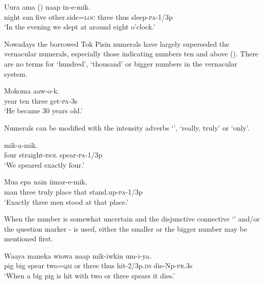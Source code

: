 \ea%
\label{ex:x90}
\gll Uura ama  ()  naap in-e-mik. \\
night sun five other.side=\textsc{loc} three thus sleep-\textsc{pa}-1/3p\\
\glt`In the evening we slept at around eight o'clock.'
\z

Nowadays the borrowed Tok Pisin numerals have largely superseded the vernacular numerals, especially those indicating numbers ten and above (). There are no terms for `hundred', `thousand' or bigger numbers in the vernacular system.

\ea%
\label{ex:x91}
\gll Mokoma   aaw-o-k. \\
year ten three get-\textsc{pa}-3s\\
\glt`He became 30 years old.'
\z

Numerals can be modified with the intensity adverbs  `',  `really, truly' or  `only'.

\ea%
\label{ex:x443}
\gll {}  mik-a-mik. \\
four straight-\textsc{isol} spear-\textsc{pa}-1/3p\\
\glt`We speared exactly four.'
\z

\ea%
\label{ex:x661}
\gll Mua   epa nain iimar-e-mik. \\
man three truly place that stand.up-\textsc{pa}-1/3p\\
\glt`Exactly three men stood at that place.'
\z

When the number is somewhat uncertain and the disjunctive connective  `' and/or the question marker - is used, either the smaller or the bigger number may be mentioned first.

\ea%
\label{ex:x1416}
\gll Waaya maneka wiowa    naap mik-iwkin um-i-ya.\\
pig big spear two=\textsc{qm} or three thus hit-2/3p.\textsc{ds} die-Np-\textsc{pr}.3s\\
\glt`When a big pig is hit with two or three spears it dies.'
\z

